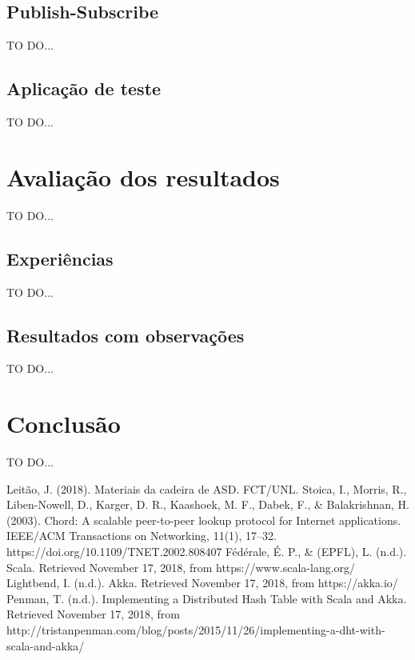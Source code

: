 \documentclass[12pt]{article}
\begin{document}
\newpage
\subsection{Publish-Subscribe}

TO DO...

\newpage
\subsection{Aplicação de teste}

TO DO...

\newpage
\section{Avaliação dos resultados}

TO DO...

\subsection{Experiências}

TO DO...

\subsection{Resultados com observações}

TO DO...

\newpage
\section{Conclusão}

TO DO...

\newpage
\begin{thebibliography}{00}
 Leitão, J. (2018). Materiais da cadeira de ASD. FCT/UNL.
 Stoica, I., Morris, R., Liben-Nowell, D., Karger, D. R., Kaashoek, M. F., Dabek, F., \& Balakrishnan, H. (2003). Chord: A scalable peer-to-peer lookup protocol for Internet applications. IEEE/ACM Transactions on Networking, 11(1), 17–32. https://doi.org/10.1109/TNET.2002.808407
 Fédérale, É. P., \& (EPFL), L. (n.d.). Scala. Retrieved November 17, 2018, from https://www.scala-lang.org/
 Lightbend, I. (n.d.). Akka. Retrieved November 17, 2018, from https://akka.io/
 Penman, T. (n.d.). Implementing a Distributed Hash Table with Scala and Akka. Retrieved November 17, 2018, from http://tristanpenman.com/blog/posts/2015/11/26/implementing-a-dht-with-scala-and-akka/
\end{thebibliography}
\end{document}
